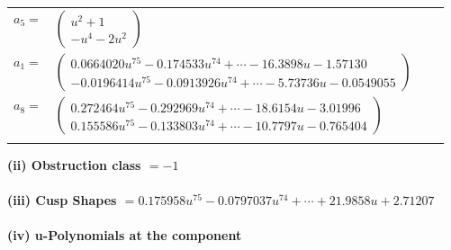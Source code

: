 \documentclass[1p]{elsarticle_modified}
\theoremstyle{definition}
\begin{document}
\begin{tabular}{m{7pt} m{180pt} m{7pt} m{180pt} }
\flushright $a_{5}=$&$\begin{pmatrix}u^2+1\\- u^4-2 u^2\end{pmatrix}$ \\
\flushright $a_{1}=$&$\begin{pmatrix}0.0664020 u^{75}-0.174533 u^{74}+\cdots-16.3898 u-1.57130\\-0.0196414 u^{75}-0.0913926 u^{74}+\cdots-5.73736 u-0.0549055\end{pmatrix}$ \\
\flushright $a_{8}=$&$\begin{pmatrix}0.272464 u^{75}-0.292969 u^{74}+\cdots-18.6154 u-3.01996\\0.155586 u^{75}-0.133803 u^{74}+\cdots-10.7797 u-0.765404\end{pmatrix}$\\&\end{tabular}
\flushleft \textbf{(ii) Obstruction class $= -1$}\\~\\
\flushleft \textbf{(iii) Cusp Shapes $= 0.175958 u^{75}-0.0797037 u^{74}+\cdots+21.9858 u+2.71207$}\\~\\
\newpage\renewcommand{\arraystretch}{1}
\flushleft \textbf{(iv) u-Polynomials at the component}\newline \\
\end{document}

